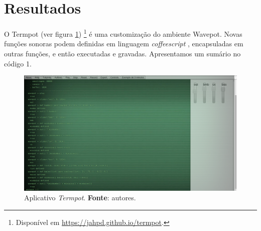 \section{Resultados}\label{sec:termpot}

O Termpot (ver figura \ref{fig:termpot}) \footnote{Disponível em \url{https://jahpd.github.io/termpot}.} é uma customização do ambiente Wavepot. Novas funções sonoras podem definidas em linguagem \emph{coffeescript} \cite{burnham2011coffeescript}, encapsuladas em outras funções, e então executadas e gravadas. Apresentamos um sumário no código 1. %

\begin{figure}[!h]
\centering
\includegraphics[scale=0.3]{termpot.png}
\caption{Aplicativo \emph{Termpot}. \textbf{Fonte}: autores.}
\label{fig:termpot}
\end{figure}

